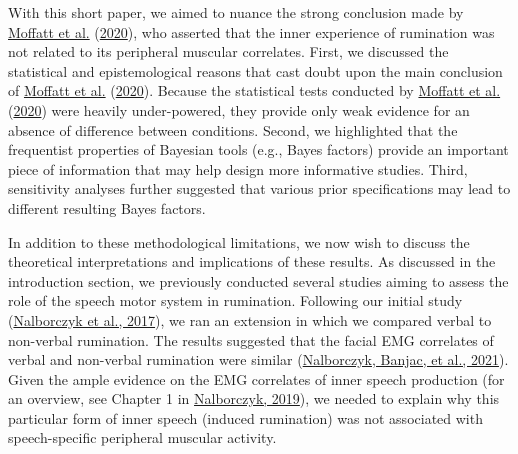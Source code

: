 \documentclass[
  english,
  man, donotrepeattitle,floatsintext]{apa6}
\begin{document}
With this short paper, we aimed to nuance the strong conclusion made by \protect\hyperlink{ref-moffatt_inner_2020}{Moffatt et al.} (\protect\hyperlink{ref-moffatt_inner_2020}{2020}), who asserted that the inner experience of rumination was not related to its peripheral muscular correlates. First, we discussed the statistical and epistemological reasons that cast doubt upon the main conclusion of \protect\hyperlink{ref-moffatt_inner_2020}{Moffatt et al.} (\protect\hyperlink{ref-moffatt_inner_2020}{2020}). Because the statistical tests conducted by \protect\hyperlink{ref-moffatt_inner_2020}{Moffatt et al.} (\protect\hyperlink{ref-moffatt_inner_2020}{2020}) were heavily under-powered, they provide only weak evidence for an absence of difference between conditions. Second, we highlighted that the frequentist properties of Bayesian tools (e.g., Bayes factors) provide an important piece of information that may help design more informative studies. Third, sensitivity analyses further suggested that various prior specifications may lead to different resulting Bayes factors.

In addition to these methodological limitations, we now wish to discuss the theoretical interpretations and implications of these results. As discussed in the introduction section, we previously conducted several studies aiming to assess the role of the speech motor system in rumination. Following our initial study (\protect\hyperlink{ref-nalborczyk_orofacial_2017}{Nalborczyk et al., 2017}), we ran an extension in which we compared verbal to non-verbal rumination. The results suggested that the facial EMG correlates of verbal and non-verbal rumination were similar (\protect\hyperlink{ref-nalborczyk_dissociating_2021}{Nalborczyk, Banjac, et al., 2021}). Given the ample evidence on the EMG correlates of inner speech production (for an overview, see Chapter 1 in \protect\hyperlink{ref-nalborczyk_understanding_2019}{Nalborczyk, 2019}), we needed to explain why this particular form of inner speech (induced rumination) was not associated with speech-specific peripheral muscular activity.
\end{document}
